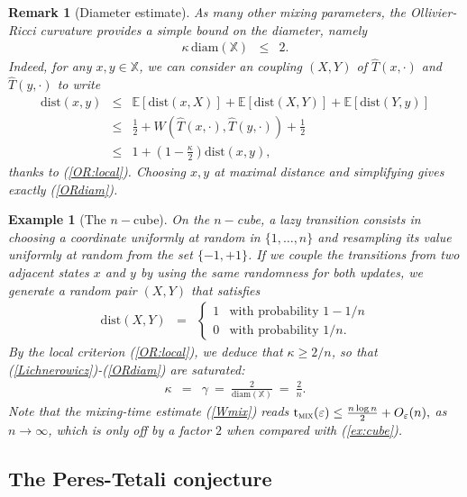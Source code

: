 \documentclass[12pt,final]{article}
\newtheorem{remark}{Remark}[section]
\newtheorem{example}{Example}[section]
\numberwithin{equation}{section}
\newcommand{\EE}{{\mathbb{E}}}
\newcommand{\dX}{\mathbb{X}}
\newcommand{\tmix}{{\rm t}_{\textsc{mix}}}
\newcommand{\dist}{\mathrm{dist}}
\newcommand{\diam}{\mathrm{diam}}
\begin{document}
\begin{remark}[Diameter estimate]\label{rk:ORdiam}As many other mixing parameters, the Ollivier-Ricci curvature provides a simple bound on the diameter, namely
\begin{eqnarray}
\label{ORdiam}
\kappa\, \diam(\dX) & \le & 2.
\end{eqnarray}
Indeed, for any $x,y\in\dX$, we can consider an coupling $(X,Y)$ of $\widehat{T}(x,\cdot)$ and $\widehat{T}(y,\cdot)$  to write
\begin{eqnarray*}
\dist(x,y) & \le & \EE\left[\dist(x,X)\right]+\EE[\dist(X,Y)]+\EE[\dist(Y,y)]\\
& \le & \frac 12+W\left(\widehat{T}(x,\cdot),\widehat{T}(y,\cdot)\right)+\frac 12\\
& \le & 1+\left(1-\frac{\kappa}{2}\right)\dist(x,y), 
\end{eqnarray*}
thanks to (\ref{OR:local}). Choosing 
 $x,y$ at maximal distance and simplifying gives exactly (\ref{ORdiam}). 
\end{remark}
\begin{example}[The $n-$cube]\label{exOR:cube}On the $n-$cube, a lazy transition  consists in choosing a  coordinate uniformly at random in $\{1,\ldots,n\}$ and resampling its value uniformly at random from the set $\{-1,+1\}$. If we couple the  transitions from two adjacent states $x$ and $y$ by using the same randomness for both updates, we generate a random pair $(X,Y)$ that satisfies
\begin{eqnarray*}
\dist(X,Y) & = & \left\{
\begin{array}{ll}
1 & \textrm{with probability }1-1/n\\
0 & \textrm{with probability }1/n.
\end{array}
\right.
\end{eqnarray*}
By the local criterion (\ref{OR:local}), we deduce that $\kappa\ge 2/n$, so that  (\ref{Lichnerowicz})-(\ref{ORdiam}) are saturated: 
\begin{eqnarray}
\kappa & = & \gamma \ = \  \frac{2}{\diam(\dX)} \ = \ \frac{2}{n}.
\end{eqnarray}
Note  that the mixing-time estimate (\ref{Wmix})  reads
$
\tmix(\varepsilon)  \le  \frac{n\log n}{2}+ O_\varepsilon(n),
$
as $n\to\infty$, which is only off by a factor $2$ when compared with  (\ref{ex:cube}).
\end{example}
\subsection{The Peres-Tetali conjecture}
\end{document}
